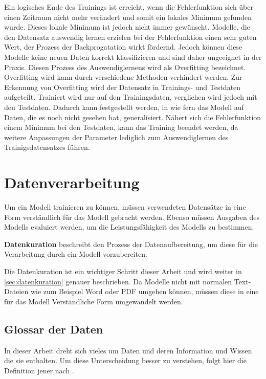 Ein logisches Ende des Trainings ist erreicht, wenn die Fehlerfunktion sich über einen Zeitraum nicht mehr verändert und somit ein lokales Minimum gefunden wurde.
Dieses lokale Minimum ist jedoch nicht immer gewünscht.
Modelle, die den Datensatz auswendig lernen erzielen bei der Fehlerfunktion einen sehr guten Wert, der Prozess der Backprogatation wirkt fördernd.
Jedoch können diese Modelle keine neuen Daten korrekt klassifizieren und sind daher ungeeignet in der Praxis.
Diesen Prozess des Auswendiglernens wird als Overfitting bezeichnet.\\

Overfitting wird kann durch verschiedene Methoden verhindert werden.
Zur Erkennung von Overfitting wird der Datensatz in Trainings- und Testdaten aufgeteilt.
Trainiert wird nur auf den Trainingsdaten, verglichen wird jedoch mit den Testdaten.
Dadurch kann festgestellt werden, in wie fern das Modell auf Daten, die es noch nicht gesehen hat, generalisiert.
Nähert sich die Fehlerfunktion einem Minimum bei den Testdaten, kann das Training beendet werden, da weitere Anpassungen der Parameter lediglich zum Auswendiglernen des Trainigsdatensatzes führen.\\


\section{Datenverarbeitung}\label{sec:datenverarbeitung}
Um ein Modell trainieren zu können, müssen verwendeten Datensätze in eine Form verständlich für das Modell gebracht werden.
Ebenso müssen Ausgaben des Modells evaluiert werden, um die Leistungsfähigkeit des Modells zu bestimmen.\\
\begin{definition}\label{def:datenkuration}
    \textbf{Datenkuration} beschreibt den Prozess der Datenaufbereitung, um diese für die Verarbeitung durch ein Modell vorzubereiten.
\end{definition}
Die Datenkuration ist ein wichtiger Schritt dieser Arbeit und wird weiter in \cref{sec:datenkuration} genauer beschrieben.
Da Modelle nicht mit normalen Text-Dateien wie zum Beispiel Word oder PDF umgehen können, müssen diese in eine für das Modell Verständliche Form umgewandelt werden.

\subsection{Glossar der Daten}
In dieser Arbeit dreht sich vieles um Daten und deren Information und Wissen die sie enthalten.
Um diese Unterscheidung besser zu verstehen, folgt hier die Definition jener nach \citet{bb}.

